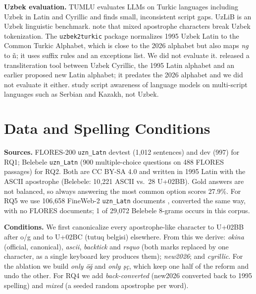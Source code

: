 \textbf{Uzbek evaluation.} TUMLU \citep{isbarov2025} evaluates LLMs on Turkic languages including Uzbek in Latin and Cyrillic and finds small, inconsistent script gaps. UzLiB \citep{shopulatov2025} is an Uzbek linguistic benchmark. \citet{sharipov2023uzbektagger} note that mixed apostrophe characters break Uzbek tokenization. The \texttt{uzbek2turkic} package \citep{sharipov2026uzbek2turkic} normalizes 1995 Uzbek Latin to the Common Turkic Alphabet, which is close to the 2026 alphabet but also maps \emph{ng} to \~{n}; it uses suffix rules and an exceptions list. We did not evaluate it. \citet{salaev2022} released a transliteration tool between Uzbek Cyrillic, the 1995 Latin alphabet and an earlier proposed new Latin alphabet; it predates the 2026 alphabet and we did not evaluate it either. \citet{kletz2026} study script awareness of language models on multi-script languages such as Serbian and Kazakh, not Uzbek.

\section{Data and Spelling Conditions}
\label{sec:data}
\textbf{Sources.} FLORES-200 \texttt{uzn\_Latn} devtest (1{,}012 sentences) and dev (997) \citep{nllb2022} for RQ1; Belebele \texttt{uzn\_Latn} \citep{bandarkar2024} (900 multiple-choice questions on 488 FLORES passages) for RQ2. Both are CC BY-SA 4.0 and written in 1995 Latin with the ASCII apostrophe (Belebele: 10{,}221 ASCII vs.\ 28 U+02BB). Gold answers are not balanced, so always answering the most common option scores 27.9\%. For RQ5 we use 106{,}658 FineWeb-2 \texttt{uzn\_Latn} documents \citep{fineweb2}, converted the same way, with no FLORES documents; 1 of 29{,}072 Belebele 8-grams occurs in this corpus.

\textbf{Conditions.} We first canonicalize every apostrophe-like character to U+02BB after o/g and to U+02BC (tutuq belgisi) elsewhere. From this we derive: \emph{okina} (official, canonical), \emph{ascii}, \emph{backtick} and \emph{rsquo} (both marks replaced by one character, as a single keyboard key produces them); \emph{new2026}; and \emph{cyrillic}. For the ablation we build \emph{only \"o\u{g}} and \emph{only \c{s}\c{c}}, which keep one half of the reform and undo the other. For RQ4 we add \emph{back-converted} (new2026 converted back to 1995 spelling) and \emph{mixed} (a seeded random apostrophe per word).

